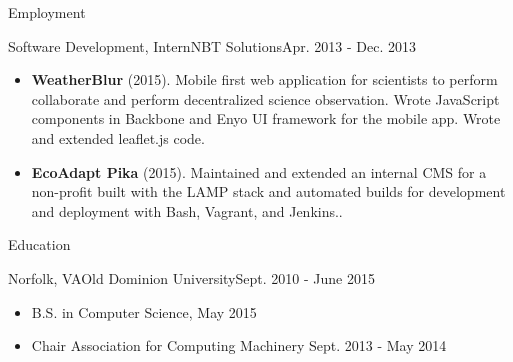 \documentclass[]{mcdowellcv}
\begin{document}
\begin{cvsection}{Employment}
        \begin{cvsubsection}{Software Development, Intern}{NBT Solutions}{Apr. 2013 - Dec. 2013}
            \begin{itemize}
                \item \textbf{WeatherBlur} (2015). Mobile first web application for scientists to perform collaborate and perform decentralized science observation. Wrote JavaScript components in Backbone and Enyo UI framework for the mobile app. Wrote and extended leaflet.js code.
                \item \textbf{EcoAdapt Pika} (2015). Maintained and extended an internal CMS for a non-profit built with the LAMP stack and automated builds for development and deployment with Bash, Vagrant, and Jenkins..
            \end{itemize}
        \end{cvsubsection}

    \end{cvsection}

    \begin{cvsection}{Education}
        \begin{cvsubsection}{Norfolk, VA}{Old Dominion University}{Sept. 2010 - June 2015}
            \begin{itemize}
                \item B.S. in Computer Science, May 2015
                \item Chair Association for Computing Machinery Sept. 2013 - May 2014
            \end{itemize}
        \end{cvsubsection}
    \end{cvsection}
\end{document}
